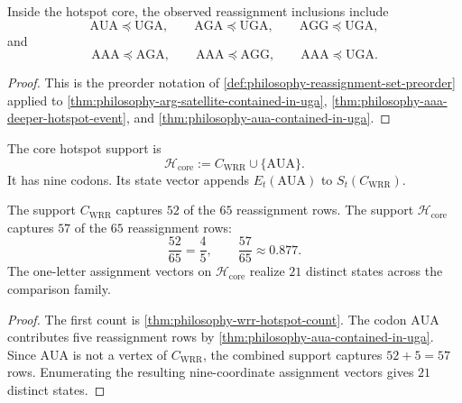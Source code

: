 \begin{corollary}
\label{cor:philosophy-core-reassignment-preorder}
Inside the hotspot core, the observed reassignment inclusions include
$$
  \mathrm{AUA}\preceq\mathrm{UGA},
  \qquad
  \mathrm{AGA}\preceq\mathrm{UGA},
  \qquad
  \mathrm{AGG}\preceq\mathrm{UGA},
$$
and
$$
  \mathrm{AAA}\preceq\mathrm{AGA},
  \qquad
  \mathrm{AAA}\preceq\mathrm{AGG},
  \qquad
  \mathrm{AAA}\preceq\mathrm{UGA}.
$$
\end{corollary}
\begin{proof}
This is the preorder notation of
\autoref{def:philosophy-reassignment-set-preorder} applied to
\autoref{thm:philosophy-arg-satellite-contained-in-uga},
\autoref{thm:philosophy-aaa-deeper-hotspot-event}, and
\autoref{thm:philosophy-aua-contained-in-uga}.
\end{proof}

\begin{definition}
\label{def:philosophy-core-hotspot-support}
The core hotspot support is
$$
  \mathcal H_{\mathrm{core}}
  :=
  C_{\mathrm{WRR}}\cup\{\mathrm{AUA}\}.
$$
It has nine codons. Its state vector appends $E_{t}(\mathrm{AUA})$ to
$S_{t}(C_{\mathrm{WRR}})$.
\end{definition}

\begin{theorem}
\label{thm:philosophy-core-hotspot-captures-reassignment-rows}
The support $C_{\mathrm{WRR}}$ captures $52$ of the $65$ reassignment
rows. The support $\mathcal H_{\mathrm{core}}$ captures $57$ of the
$65$ reassignment rows:
$$
  \frac{52}{65}=\frac45,
  \qquad
  \frac{57}{65}\approx 0.877.
$$
The one-letter assignment vectors on $\mathcal H_{\mathrm{core}}$
realize $21$ distinct states across the comparison family.
\end{theorem}
\begin{proof}
The first count is \autoref{thm:philosophy-wrr-hotspot-count}. The codon
$\mathrm{AUA}$ contributes five reassignment rows by
\autoref{thm:philosophy-aua-contained-in-uga}. Since $\mathrm{AUA}$ is
not a vertex of $C_{\mathrm{WRR}}$, the combined support captures
$52+5=57$ rows. Enumerating the resulting nine-coordinate assignment
vectors gives $21$ distinct states.
\end{proof}

